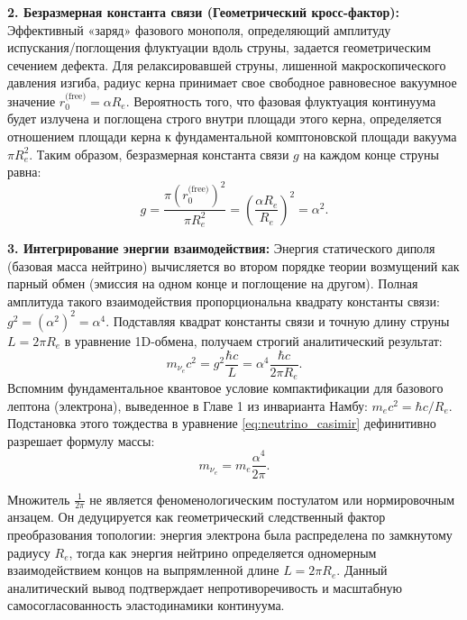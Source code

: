 \documentclass[11pt,a4paper]{article}
\begin{document}
	\textbf{2. Безразмерная константа связи (Геометрический кросс-фактор):}
	Эффективный «заряд» фазового монополя, определяющий амплитуду испускания/поглощения флуктуации вдоль струны, задается геометрическим сечением дефекта. 
	Для релаксировавшей струны, лишенной макроскопического давления изгиба, радиус керна принимает свое свободное равновесное вакуумное значение $r_0^{\text{(free)}} = \alpha R_e$. 
	Вероятность того, что фазовая флуктуация континуума будет излучена и поглощена строго внутри площади этого керна, определяется отношением площади керна к фундаментальной комптоновской площади вакуума $\pi R_e^2$. Таким образом, безразмерная константа связи $g$ на каждом конце струны равна:
	\begin{equation}
		g = \frac{\pi (r_0^{\text{(free)}})^2}{\pi R_e^2} = \left( \frac{\alpha R_e}{R_e} \right)^2 = \alpha^2.
	\end{equation}
	
	\textbf{3. Интегрирование энергии взаимодействия:}
	Энергия статического диполя (базовая масса нейтрино) вычисляется во втором порядке теории возмущений как парный обмен (эмиссия на одном конце и поглощение на другом). Полная амплитуда такого взаимодействия пропорциональна квадрату константы связи: $g^2 = (\alpha^2)^2 = \alpha^4$.
	Подставляя квадрат константы связи и точную длину струны $L = 2\pi R_e$ в уравнение 1D-обмена, получаем строгий аналитический результат:
	\begin{equation}
		m_{\nu_e} c^2 = g^2 \frac{\hbar c}{L} = \alpha^4 \frac{\hbar c}{2\pi R_e}.
		\label{eq:neutrino_casimir}
	\end{equation}
	Вспомним фундаментальное квантовое условие компактификации для базового лептона (электрона), выведенное в Главе 1 из инварианта Намбу: $m_e c^2 = \hbar c / R_e$. Подстановка этого тождества в уравнение \eqref{eq:neutrino_casimir} дефинитивно разрешает формулу массы:
	\begin{equation}
		m_{\nu_e} = m_e \frac{\alpha^4}{2\pi}.
	\end{equation}
	
	Множитель $\frac{1}{2\pi}$ не является феноменологическим постулатом или нормировочным анзацем. Он дедуцируется как геометрический следственный фактор преобразования топологии: энергия электрона была распределена по замкнутому радиусу $R_e$, тогда как энергия нейтрино определяется одномерным взаимодействием концов на выпрямленной длине $L = 2\pi R_e$. Данный аналитический вывод подтверждает непротиворечивость и масштабную самосогласованность эластодинамики континуума.
	
\end{document}
